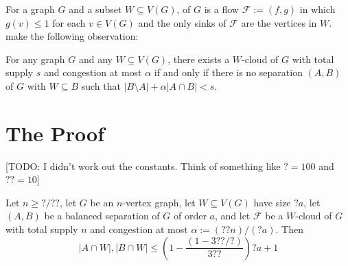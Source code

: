 \documentclass{patmorin}
\begin{document}
For a graph $G$ and a subset $W\subseteq V(G)$,  of $G$ is a flow $\mathcal{F}:=(f,g)$ in which $g(v)\le 1$ for each $v\in V(G)$ and the only sinks of $\mathcal{F}$ are the vertices in $W$.  \citet{dvorak.norin:treewidth} make the following observation:

\begin{obs}\label{w_cloud_menger}
  For any graph $G$ and any $W\subseteq V(G)$, there exists a $W$-cloud of $G$ with total supply $s$ and congestion at most $\alpha$ if and only if there is no separation $(A,B)$ of $G$ with $W\subseteq B$ such that $|B\setminus A| + \alpha|A\cap B| < s$.
\end{obs}

\section{The Proof}

[TODO: I didn't work out the constants. Think of something like ${?}=100$ and ${??}=10$]

\begin{lem}\label{balanced_on_w}
  Let $n\ge {?}/{??}$, let $G$ be an $n$-vertex graph, let $W\subseteq V(G)$ have size ${?}a$, let $(A,B)$ be a balanced separation of $G$ of order $a$, and let $\mathcal{F}$ be a $W$-cloud of $G$ with total supply $n$ and congestion at most $\alpha:=({??}n)/({?}a)$.  Then
  \[
  |A\cap W|,|B\cap W|\le \left(1-\frac{(1-3{??}/{?})}{3{??}}\right)?a + 1
  \]
\end{lem}
\end{document}
